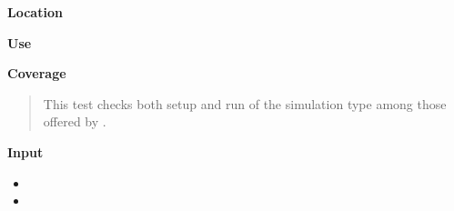 \documentclass[letterpaper,10pt,english]{manual}
\begin{document}
\textbf{Location}
\begin{quote}

\end{quote}

\textbf{Use}
\begin{quote}

\end{quote}

\textbf{Coverage}
\begin{quote}

This test checks both setup and run of the  simulation type among those offered by .
\end{quote}

\textbf{Input}
\begin{itemize}
\item {} 

\item {} 

\end{itemize}


\renewcommand{\indexname}{Module Index}
\printmodindex
\renewcommand{\indexname}{Index}
\printindex
\end{document}
